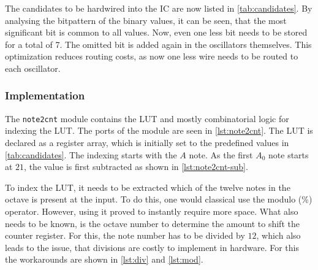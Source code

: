 The candidates to be hardwired into the IC are now listed in \autoref{tab:candidates}. By analysing the bitpattern of the binary values, it can be seen, that the most significant bit is common to all values. Now, even one less bit needs to be stored for a total of \SI{7}{\bit}. The omitted bit is added again in the oscillators themselves. This optimization reduces routing costs, as now one less wire needs to be routed to each oscillator.

\begin{table}[h]
	\centering
	\caption{Final values of the half counter periods to be stored in the \acs{LUT}. The values are stored with the removal of redundant bits.}\label{tab:candidates}
	
\end{table}

\subsubsection{Implementation}

The \texttt{note2cnt} module contains the \acl{LUT} and mostly combinatorial logic for indexing the \acs{LUT}. The ports of the module are seen in \autoref{lst:note2cnt}. The \acl{LUT} is declared as a register array, which is initially set to the predefined values in \autoref{tab:candidates}. The indexing starts with the $A$ note. As the first $A_0$ note starts at $21$, the value is first subtracted as shown in \autoref{lst:note2cnt-sub}.







To index the \acs{LUT}, it needs to be extracted which of the twelve notes in the octave is present at the input. To do this, one would classical use the modulo (\si{\percent}) operator. However, using it proved to instantly require more space. What also needs to be known, is the octave number to determine the amount to shift the counter register. For this, the note number has to be divided by $12$, which also leads to the issue, that divisions are costly to implement in hardware. For this the workarounds are shown in \autoref{lst:div} and \autoref{lst:mod}.

